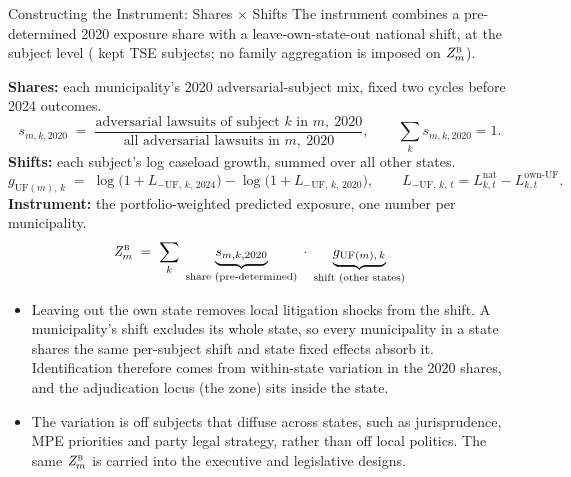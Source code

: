 
\begin{frame}{Constructing the Instrument: Shares $\times$ Shifts}
\hypertarget{src:instrument}{}
\footnotesize
The instrument combines a pre-determined 2020 exposure share with a leave-own-state-out national shift, at the subject level (\NSubjectsKept{} kept TSE subjects; no family aggregation is imposed on $\mathit{Z}_{m}^{\textsc{b}}$).
\smallskip

\textbf{Shares:} each municipality's 2020 adversarial-subject mix, fixed two cycles before 2024 outcomes.
\[
s_{m,k,2020} \;=\; \frac{\text{adversarial lawsuits of subject } k \text{ in } m,\ 2020}{\text{all adversarial lawsuits in } m,\ 2020},
\qquad \sum_k s_{m,k,2020}=1.
\]
\textbf{Shifts:} each subject's log caseload growth, summed over all other states.
\[
g_{\text{UF}(m),\,k} \;=\; \log\!\bigl(1 + L_{-\text{UF},\,k,\,2024}\bigr) - \log\!\bigl(1 + L_{-\text{UF},\,k,\,2020}\bigr),
\qquad L_{-\text{UF},\,k,\,t} = L^{\text{nat}}_{k,t} - L^{\text{own-UF}}_{k,t}.
\]
\textbf{Instrument:} the portfolio-weighted predicted exposure, one number per municipality.
\[
\mathit{Z}_{m}^{\textsc{b}} \;=\; \sum_{k} \; \underbrace{s_{m,k,2020}}_{\text{share (pre-determined)}} \;\cdot\; \underbrace{g_{\text{UF}(m),\,k}}_{\text{shift (other states)}}
\]
\smallskip
\begin{itemize}\itemsep2pt
  \item Leaving out the own state removes local litigation shocks from the shift. A municipality's shift excludes its whole state, so every municipality in a state shares the same per-subject shift and state fixed effects absorb it. Identification therefore comes from within-state variation in the 2020 shares, and the adjudication locus (the zone) sits inside the state.
  \item The variation is off subjects that diffuse across states, such as jurisprudence, MPE priorities and party legal strategy, rather than off local politics. The same $\mathit{Z}_{m}^{\textsc{b}}$ is carried into the executive and legislative designs.
\end{itemize}
\end{frame}
